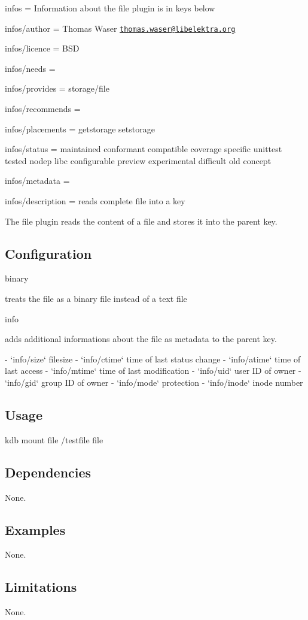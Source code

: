 
\begin{DoxyItemize}
\item infos = Information about the file plugin is in keys below
\item infos/author = Thomas Waser \href{mailto:thomas.waser@libelektra.org}{\tt thomas.\+waser@libelektra.\+org}
\item infos/licence = B\+SD
\item infos/needs =
\item infos/provides = storage/file
\item infos/recommends =
\item infos/placements = getstorage setstorage
\item infos/status = maintained conformant compatible coverage specific unittest tested nodep libc configurable preview experimental difficult old concept
\item infos/metadata =
\item infos/description = reads complete file into a key
\end{DoxyItemize}

The file plugin reads the content of a file and stores it into the parent key.

\subsection*{Configuration}


\begin{DoxyItemize}
\item {\ttfamily binary} \begin{DoxyVerb}  treats the file as a binary file instead of a text file
\end{DoxyVerb}

\item {\ttfamily info} \begin{DoxyVerb}  adds additional informations about the file as metadata to the parent key.

  - `info/size` filesize
  - `info/ctime` time of last status change
  - `info/atime` time of last access
  - `info/mtime` time of last modification
  - `info/uid` user ID of owner
  - `info/gid` group ID of owner
  - `info/mode` protection
  - `info/inode` inode number
\end{DoxyVerb}

\end{DoxyItemize}

\subsection*{Usage}

{\ttfamily kdb mount file /testfile file}

\subsection*{Dependencies}

None.

\subsection*{Examples}

None.

\subsection*{Limitations}

None. 